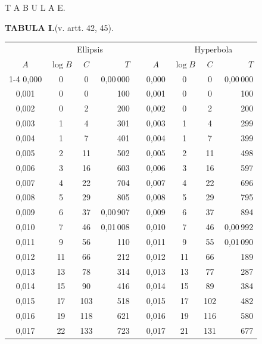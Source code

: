 \clearpage
{}
\thispagestyle{empty}
\vspace*{2.5in}
\begin{center}{\Large T A B U L A E.}\end{center}
\clearpage
{}
\begingroup
\centering
\fontsize{9}{9}\selectfont
\setlength{\tabcolsep}{6pt}
\renewcommand{\arraystretch}{1}
\setlength{\parskip}{0pt}
\textbf{TABULA I.}\quad (v. artt. 42, 45).
\par\vspace{7pt}
\begin{tabular}{|c|c|c|r|@{}p{9pt}@{}|c|c|c|r|}
\hline
 & \multicolumn{3}{c|}{Ellipsis} & & & \multicolumn{3}{c|}{Hyperbola} \\
\(A\) & \(\log B\) & \(C\) & \(T\) & & \(A\) & \(\log B\) & \(C\) & \(T\) \\
\cline{1-4}\cline{6-9}
0,000 & 0 & 0 & 0,00\,000 &  & 0,000 & 0 & 0 & 0,00\,000 \\
0,001 & 0 & 0 & 100 &  & 0,001 & 0 & 0 & 100 \\
0,002 & 0 & 2 & 200 &  & 0,002 & 0 & 2 & 200 \\
0,003 & 1 & 4 & 301 &  & 0,003 & 1 & 4 & 299 \\
0,004 & 1 & 7 & 401 &  & 0,004 & 1 & 7 & 399 \\
0,005 & 2 & 11 & 502 &  & 0,005 & 2 & 11 & 498 \\[3pt]
0,006 & 3 & 16 & 603 &  & 0,006 & 3 & 16 & 597 \\
0,007 & 4 & 22 & 704 &  & 0,007 & 4 & 22 & 696 \\
0,008 & 5 & 29 & 805 &  & 0,008 & 5 & 29 & 795 \\
0,009 & 6 & 37 & 0,00\,907 &  & 0,009 & 6 & 37 & 894 \\
0,010 & 7 & 46 & 0,01\,008 &  & 0,010 & 7 & 46 & 0,00\,992 \\[3pt]
0,011 & 9 & 56 & 110 &  & 0,011 & 9 & 55 & 0,01\,090 \\
0,012 & 11 & 66 & 212 &  & 0,012 & 11 & 66 & 189 \\
0,013 & 13 & 78 & 314 &  & 0,013 & 13 & 77 & 287 \\
0,014 & 15 & 90 & 416 &  & 0,014 & 15 & 89 & 384 \\
0,015 & 17 & 103 & 518 &  & 0,015 & 17 & 102 & 482 \\[3pt]
0,016 & 19 & 118 & 621 &  & 0,016 & 19 & 116 & 580 \\
0,017 & 22 & 133 & 723 &  & 0,017 & 21 & 131 & 677 \\

\end{tabular}

